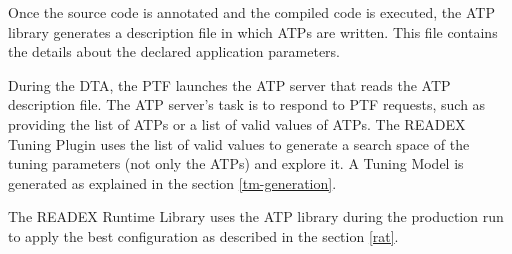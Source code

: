 Once the source code is annotated and the compiled code is executed, the ATP library generates a description file in which 
ATPs are written. This file contains the details about the declared application parameters.

During the DTA, the PTF launches the ATP server that reads the ATP description file. The ATP server's task is to respond to 
PTF requests, such as providing the list of ATPs or a list of valid values of ATPs. The READEX Tuning Plugin uses the list 
of valid values to generate a search space of the tuning parameters (not only the ATPs) and explore it. A Tuning Model is 
generated as explained in the section \ref{tm-generation}.

The READEX Runtime Library uses the ATP library during the production run to apply the best configuration as described in the 
section \ref{rat}. 




